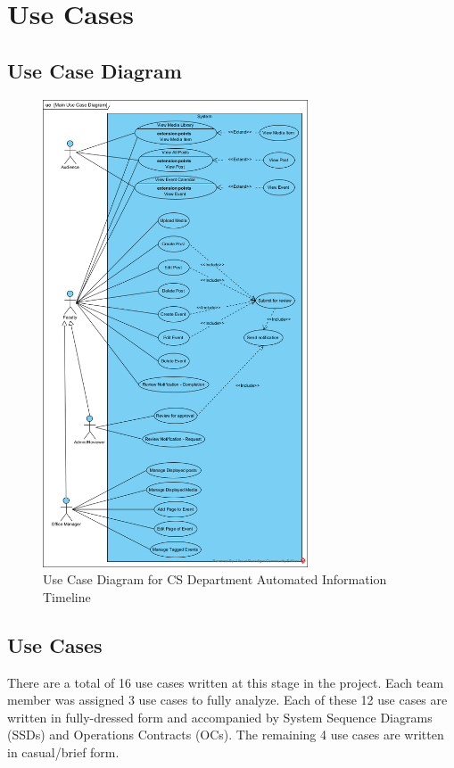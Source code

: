 \documentclass{article}
\begin{document}
\section{Use Cases}
\subsection{Use Case Diagram}
\begin{figure}[H]
    \centering
    \includegraphics[width=0.7\textwidth]{images/UCD.png}
    \centering
    \caption{Use Case Diagram for CS Department Automated Information Timeline}
\end{figure}
\subsection{Use Cases}
There are a total of 16 use cases written at this stage in the project. Each team member was assigned 3 use cases to fully analyze. Each of these 12 use cases are written in fully-dressed form and accompanied by System Sequence Diagrams (SSDs) and Operations Contracts (OCs). The remaining 4 use cases are written in casual/brief form.
\end{document}

